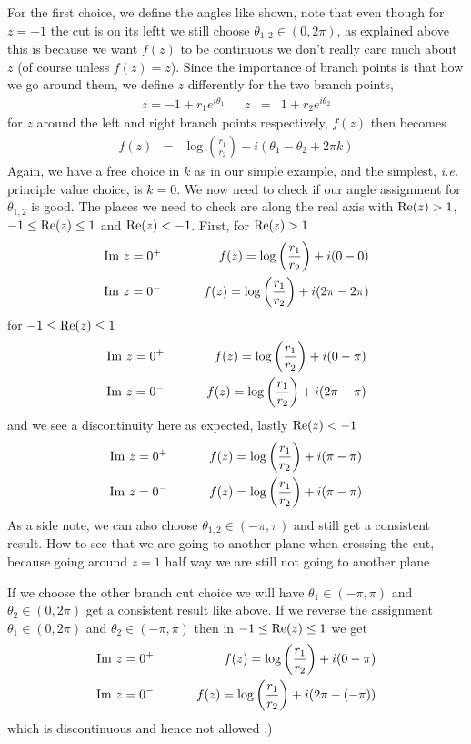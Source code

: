 \documentclass[aps,preprint,preprintnumbers,nofootinbib,showpacs,prd]{revtex4-1}
\newcommand{\ie}{{\it i.e.} }
\newcommand{\nbea}{\begin{eqnarray*}}
\newcommand{\neea}{\end{eqnarray*}}
\def\Im{{\rm Im}}
\newcommand{\re}{{\rm Re}}
\begin{document}
For the first choice, we define the angles like shown, note that even though for $z = +1$ the cut is on its leftt we still choose $\theta_{1,2} \in (0,2\pi)$, as explained above this is because we want $f(z)$ to be continuous we don't really care much about $z$ (of course unless $f(z) = z$). Since the importance of branch points is that how we go around them, we define $z$ differently for the two branch points,
%
\nbea
z = -1 + r_1e^{i\theta_1} ~~~~~~~ z & = & 1 + r_2e^{i\theta_2}
\neea
%
for $z$ around the left and right branch points respectively, $f(z)$ then becomes
%
\nbea
f(z) & = & \log \left ( \frac{r_1}{r_2}\right ) + i (\theta_1 - \theta_2 + 2\pi k)
\neea
%
Again, we have a free choice in $k$ as in our simple example, and the simplest, \ie principle value choice, is $k = 0$. We now need to check if our angle assignment for $\theta_{1,2}$ is good. The places we need to check are along the real axis with $\re(z) > 1$, $-1 \le \re(z) \le 1$ and $\re(z) < -1$. First, for $\re(z) > 1$
%
\nbea
\Im ~ z = 0^+  & ~~~~~~~ & f(z) = \log \left( \frac{r_1}{r_2} \right ) + i (0 - 0) \\
\Im ~ z = 0^- & ~~~~~~~ & f(z) = \log \left( \frac{r_1}{r_2} \right ) + i (2\pi - 2\pi)
\neea
%
for $-1 \le \re(z) \le 1$
%
\nbea
\Im ~ z = 0^+ & ~~~~~~~ & f(z) = \log \left( \frac{r_1}{r_2} \right ) + i (0 - \pi) \\
\Im ~ z = 0^- & ~~~~~~~ & f(z) = \log \left( \frac{r_1}{r_2} \right ) + i (2\pi - \pi)
\neea
%
and we see a discontinuity here as expected, lastly $\re(z) < -1$
%
\nbea
\Im ~ z = 0^+ & ~~~~~~~ & f(z) = \log \left( \frac{r_1}{r_2} \right ) + i (\pi - \pi) \\
\Im ~ z = 0^- & ~~~~~~~ & f(z) = \log \left( \frac{r_1}{r_2} \right ) + i (\pi - \pi)
\neea
%
As a side note, we can also choose $\theta_{1,2} \in (-\pi, \pi)$ and still get a consistent result. How to see that we are going to another plane when crossing the cut, because going around $z = 1$ half way we are still not going to another plane


If we choose the other branch cut choice we will have $\theta_1 \in (-\pi, \pi)$ and $\theta_2 \in (0, 2\pi)$ get a consistent result like above. If we reverse the assignment $\theta_1 \in (0, 2\pi)$ and $\theta_2 \in (-\pi, \pi)$ then in $-1 \le \re(z) \le 1$ we get
%
\nbea
\Im ~ z = 0^+ & ~~~~~~~ & f(z) = \log \left( \frac{r_1}{r_2} \right ) + i (0 - \pi) \\
\Im ~ z = 0^- & ~~~~~~~ & f(z) = \log \left( \frac{r_1}{r_2} \right ) + i (2\pi - (-\pi))
\neea
%
which is discontinuous and hence not allowed :)
\end{document}
